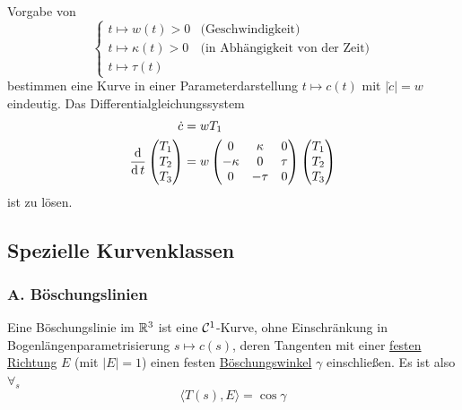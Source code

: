 \begin{variante}
 Vorgabe von \[\begin{cases}
                t \mapsto w(t) > 0 & \text{(Geschwindigkeit)} \\
                t \mapsto \kappa(t) > 0 & \text{(in Abhängigkeit von der Zeit)} \\
                t \mapsto \tau(t)
               \end{cases}\]
 bestimmen eine Kurve in einer Parameterdarstellung \(t \mapsto c(t)\) mit \(|\dot c| = w\) eindeutig. Das Differentialgleichungssystem 
 \begin{align*}
  \dot c &= w T_1 \\
  \frac{\operatorname{d}}{\operatorname{d} t}\begin{pmatrix} T_1 \\ T_2 \\ T_3 \end{pmatrix}  &= w \begin{pmatrix}
                                             0 & \kappa & 0 \\
                                             -\kappa & 0 & \tau \\
                                             0 & -\tau & 0 
                                            \end{pmatrix} \begin{pmatrix} T_1 \\ T_2 \\ T_3 \end{pmatrix} 
 \end{align*}
 ist zu lösen.
\end{variante}

\subsection{Spezielle Kurvenklassen}
\subsubsection{A. Böschungslinien}

\begin{definition}
 Eine Böschungslinie im \(\mathbb{R}^3\) ist eine \(\mathcal{C}^1\)-Kurve, ohne Einschränkung in Bogenlängenparametrisierung \(s \mapsto c(s)\), deren Tangenten mit einer \uline{festen Richtung} \(E\) (mit \(|E| = 1\)) einen festen \uline{Böschungswinkel} \(\gamma\) einschließen. Es ist also \(\forall_s\)
 \[
  \langle T(s), E \rangle = \cos \gamma
 \]
\end{definition}

